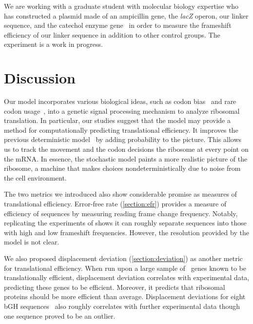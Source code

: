 \documentclass[12pt]{article}
\begin{document}
We are working with a graduate student with molecular biology expertise 
who has constructed a plasmid made of an ampicillin gene, the \emph{lacZ} 
operon, our linker sequence, and the catechol enzyme gene \xylE\ in order 
to measure the frameshift efficiency of our linker sequence in addition 
to other control groups. The experiment is a work in progress.

\section{Discussion}
\label{section:discussion}

Our model incorporates various biological ideas,
such as codon bias~\cite{ikemura} and rare codon usage~\cite{kane95},
into a genetic signal processing mechanism to analyze ribosomal translation.
In particular, our studies suggest that the model may
provide a method for computationally predicting translational efficiency.
It improves the previous deterministic
model~\cite{lalit:mechanics} by adding probability to the picture. This allows us
to track the movement and the codon decisions the ribosome at every point on 
the mRNA.  In essence, the stochastic model paints a more realistic picture of the
ribosome, a machine that makes choices nondeterministically
due to noise from the cell environment.

The two metrics we introduced also show considerable promise
as measures of translational efficiency.  Error-free rate (\autoref{section:efr})
provides a measure of efficiency of sequences by
measuring reading frame change frequency.  Notably, replicating the experiments
of \citet{weiss87} shows it can roughly separate sequences into
those with high and low frameshift frequencies. However, the
resolution provided by the model is not clear.

We also proposed displacement deviation (\autoref{section:deviation}) as another metric for translational efficiency.
When run upon a large sample of \ecoli\ genes known to be translationally efficient,
displacement deviation correlates with experimental data, predicting
these genes to be efficient.  Moreover, it predicts that ribosomal proteins should
be more efficient than average.  Displacement deviations for eight bGH
sequences~\cite{schoner:bgh} also roughly correlates with further
experimental data though one sequence proved to be an outlier.
\end{document}
